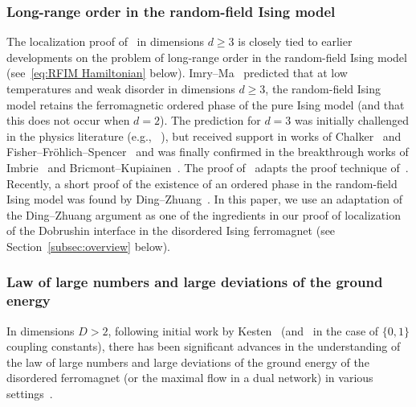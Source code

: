 \documentclass[11pt, reqno]{amsart}
\numberwithin{equation}{section}
\begin{document}
\subsubsection{Long-range order in the random-field Ising model} The localization proof of~\cite{BK} in dimensions $d\ge 3$ is closely tied to earlier developments on the problem of long-range order in the random-field Ising model (see~\eqref{eq:RFIM Hamiltonian} below). Imry--Ma~\cite{IM75} predicted that at low temperatures and weak disorder in dimensions $d\ge3$, the random-field Ising model retains the ferromagnetic ordered phase of the pure Ising model (and that this does not occur when $d=2$). The prediction for $d=3$ was initially challenged in the physics literature (e.g., ~\cite{PS79}), but received support in works of Chalker~\cite{C83} and Fisher--Fr\"ohlich--Spencer~\cite{FFS} and was finally confirmed in the breakthrough works of Imbrie~\cites{I84,I85} and Bricmont--Kupiainen~\cites{BK87, BK88}. The proof of~\cite{BK} adapts the proof technique of~\cite{BK88}. Recently, a short proof of the existence of an ordered phase in the random-field Ising model was found by Ding--Zhuang~\cite{DZ}. In this paper, we use an adaptation of the Ding--Zhuang argument as one of the ingredients in our proof of localization of the Dobrushin interface in the disordered Ising ferromagnet (see Section~\ref{subsec:overview} below). 

\subsubsection{Law of large numbers and large deviations of the ground energy} In dimensions $D>2$, following initial work by Kesten~\cite{K87} (and~\cites{ACCFR83, CC86} in the case of $\{0,1\}$ coupling constants), there has been significant advances in the understanding of the law of large numbers and large deviations of the ground energy of the disordered ferromagnet (or the maximal flow in a dual network) in various settings~\cites{Z00,Z18,T07,T08,W09,RT10,CT11a,CT11b,CT11c,T14,CT14,D20,DT20,DT21}.
\end{document}
